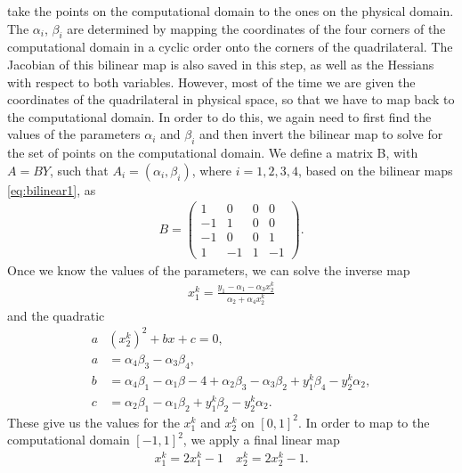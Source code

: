 \documentclass[11pt, a4paper]{article}
\theoremstyle{definition}
\begin{document}
take the points on the computational domain to the ones on the physical domain. The $\alpha_i$, $\beta_i$ are determined by mapping the coordinates of the four corners of the computational domain in a cyclic order onto the corners of the quadrilateral. 
The Jacobian of this bilinear map is also saved in this step, as well as the Hessians with respect to both variables.
However, most of the time we are given the coordinates of the quadrilateral in physical space, so that we have to map back to the computational domain. In order to do this, we again need to first find the values of the parameters $\alpha_i$ and $\beta_i$ and then invert the bilinear map to solve for the set of points on the computational domain.
We define a matrix B, with $A = BY$, such that $A_i = (\alpha_i, \beta_i)$, where $i = 1,2,3,4$, based on the bilinear maps \eqref{eq:bilinear1}, as
\begin{align*}
	B  =
	\begin{pmatrix}
		1 & 0 & 0 & 0 \\
		- 1 & 1 & 0 & 0 \\
		-1 & 0 & 0 & 1 \\
		1 & -1 & 1 & -1
	\end{pmatrix}	.
\end{align*}
Once we know the values of the parameters, we can solve the inverse map
\begin{align*}
	x_1^k = \frac{y_1 - \alpha_1 -\alpha_3 x_2^k}{\alpha_2 + \alpha_4 x_2^k}
\end{align*}
and the quadratic
\begin{align*}
	a&\left(x_2^k\right)^2 + bx + c = 0,\\
	a &= \alpha_4 \beta_3 - \alpha_3 \beta_4,\\
	b &= \alpha_4 \beta_1 - \alpha_1 \beta-4 + \alpha_2 \beta_3 -\alpha_3 \beta_2 + y_1^k \beta_4 - y_2^k \alpha_2,\\
	c &= \alpha_2 \beta_1 - \alpha_1 \beta_2 + y_1^k \beta_2 - y_2^k \alpha_2.
\end{align*}
These give us the values for the $x_1^k$ and $x_2^k$ on $[0,1]^2$. In order to map to the computational domain $[-1,1]^2$, we apply a final linear map
\begin{align*}
	x_1^k = 2x_1^k - 1 \quad	x_2^k = 2x_2^k - 1.
\end{align*}
\end{document}
